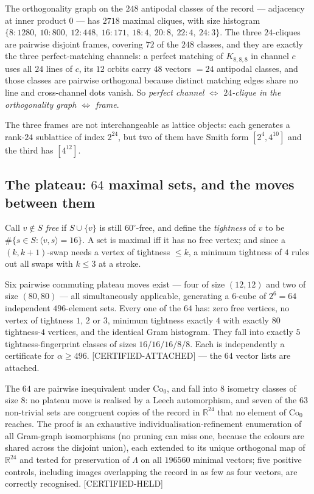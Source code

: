 \documentclass[10pt,a4paper]{article}
\newcommand{\CA}{\textsf{[CERTIFIED-ATTACHED]}}
\newcommand{\CH}{\textsf{[CERTIFIED-HELD]}}
\newcommand{\Lam}{\Lambda}
\newcommand{\Co}{\mathrm{Co}_0}
\newcommand{\ip}[2]{\langle #1,#2\rangle}
\begin{document}
The orthogonality graph on the $248$ antipodal classes of the record --- adjacency at inner
product $0$ --- has $2718$ maximal cliques, with size histogram
$\{8{:}1280,\ 10{:}800,\ 12{:}448,\ 16{:}171,\ 18{:}4,\ 20{:}8,\ 22{:}4,\ 24{:}3\}$.
The three $24$-cliques are pairwise disjoint frames, covering $72$ of the $248$ classes, and they are exactly
the three perfect-matching channels: a perfect matching of $K_{8,8,8}$ in channel $c$ uses all $24$
lines of $c$, its $12$ orbits carry $48$ vectors $=24$ antipodal classes, and those classes are
pairwise orthogonal because distinct matching edges share no line and cross-channel dots vanish. So
\emph{perfect channel $\iff$ $24$-clique in the orthogonality graph $\iff$ frame}.

The three frames are not interchangeable as lattice objects: each generates a rank-$24$ sublattice
of index $2^{24}$, but two of them have Smith form $[2^4, 4^{10}]$ and the third has $[4^{12}]$.

\subsection{The plateau: $64$ maximal sets, and the moves between them}\label{sec:plateau}

Call $v \notin S$ \emph{free} if $S \cup \{v\}$ is still $60^\circ$-free, and define the
\emph{tightness} of $v$ to be $\#\{s \in S : \ip{v}{s} = 16\}$. A set is maximal iff it has no free
vertex; and since a $(k,k+1)$-swap needs a vertex of tightness $\le k$, a minimum tightness of $4$
rules out all swaps with $k \le 3$ at a stroke.

Six pairwise commuting plateau moves exist --- four of size $(12,12)$ and two of size $(80,80)$ ---
all simultaneously applicable, generating a $6$-cube of $2^6 = 64$ independent $496$-element sets.
Every one of the $64$ has: zero free vertices, no vertex of tightness $1$, $2$ or $3$, minimum
tightness exactly $4$ with exactly $80$ tightness-$4$ vertices, and the identical Gram histogram.
They fall into exactly $5$ tightness-fingerprint classes of sizes $16/16/16/8/8$. Each is
independently a certificate for $\alpha \ge 496$. \CA{} --- the $64$ vector lists are attached.

The $64$ are pairwise inequivalent under $\Co$, and fall into $8$ isometry classes of size $8$: no
plateau move is realised by a Leech automorphism, and seven of the $63$ non-trivial sets are
congruent copies of the record in $\mathbb{R}^{24}$ that no element of $\Co$ reaches. The proof is an
exhaustive individualisation-refinement enumeration of all Gram-graph isomorphisms (no pruning can
miss one, because the colours are shared across the disjoint union), each extended to its unique
orthogonal map of $\mathbb{R}^{24}$ and tested for preservation of $\Lam$ on all $196560$ minimal
vectors; five positive controls, including images overlapping the record in as few as four vectors,
are correctly recognised. \CH{}
\end{document}
